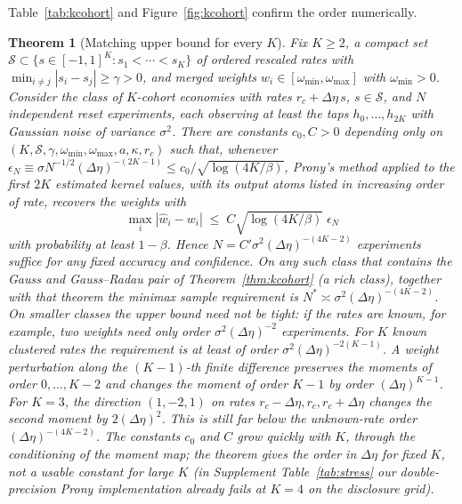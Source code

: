 \documentclass[12pt]{article}
\newtheorem{theorem}{Theorem}[section]
\theoremstyle{definition}
\theoremstyle{remark}
\begin{document}
 Table~\ref{tab:kcohort} and Figure~\ref{fig:kcohort} confirm the order numerically.





\begin{theorem}[Matching upper bound for every $K$]\label{prop:esprit}
Fix $K\ge2$, a compact set $\mathcal S\subset\{s\in[-1,1]^K:s_1<\cdots<s_K\}$ of ordered rescaled rates with $\min_{i\ne j}|s_i-s_j|\ge\gamma>0$, and merged weights $w_i\in[\omega_{\min},\omega_{\max}]$ with $\omega_{\min}>0$. Consider the class of $K$-cohort economies with rates $r_c+\Delta\eta\,s$, $s\in\mathcal S$, and $N$ independent reset experiments, each observing at least the taps $h_0,\ldots,h_{2K}$ with Gaussian noise of variance $\sigma^2$. There are constants $c_0,C>0$ depending only on $(K,\mathcal S,\gamma,\omega_{\min},\omega_{\max},a,\kappa,r_c)$ such that, whenever $\epsilon_N\equiv\sigma N^{-1/2}(\Delta\eta)^{-(2K-1)}\le c_0/\sqrt{\log(4K/\beta)}$, Prony's method applied to the first $2K$ estimated kernel values, with its output atoms listed in increasing order of rate, recovers the weights with
\[
\max_i|\hat w_i-w_i|\;\le\;C\sqrt{\log(4K/\beta)}\;\epsilon_N
\]
with probability at least $1-\beta$. Hence $N=C'\sigma^2(\Delta\eta)^{-(4K-2)}$ experiments suffice for any fixed accuracy and confidence. On any such class that contains the Gauss and Gauss--Radau pair of Theorem~\ref{thm:kcohort} (a rich class), together with that theorem the minimax sample requirement is $N^*\asymp\sigma^2(\Delta\eta)^{-(4K-2)}$. On smaller classes the upper bound need not be tight: if the rates are known, for example, two weights need only order $\sigma^2(\Delta\eta)^{-2}$ experiments. For $K$ known clustered rates the requirement is at least of order $\sigma^2(\Delta\eta)^{-2(K-1)}$. A weight perturbation along the $(K-1)$-th finite difference preserves the moments of order $0,\ldots,K-2$ and changes the moment of order $K-1$ by order $(\Delta\eta)^{K-1}$. For $K=3$, the direction $(1,-2,1)$ on rates $r_c-\Delta\eta,r_c,r_c+\Delta\eta$ changes the second moment by $2(\Delta\eta)^2$. This is still far below the unknown-rate order $(\Delta\eta)^{-(4K-2)}$. The constants $c_0$ and $C$ grow quickly with $K$, through the conditioning of the moment map; the theorem gives the order in $\Delta\eta$ for fixed $K$, not a usable constant for large $K$ (in Supplement Table~\ref{tab:stress} our double-precision Prony implementation already fails at $K=4$ on the disclosure grid).
\end{theorem}
\end{document}
